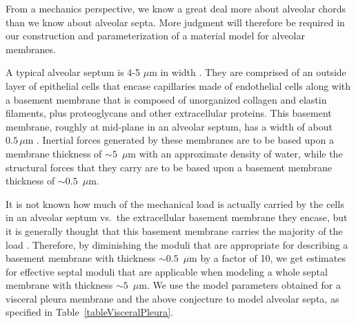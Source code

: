 From a mechanics perspective, we know a great deal more about alveolar chords than we know about alveolar septa.  More judgment will therefore be required in our construction and parameterization of a material model for alveolar membranes.  

A typical alveolar septum is 4-5 $\mu$m in width \cite{Sukietal11}.  They are comprised of an outside layer of epithelial cells that encase capillaries made of endothelial cells along with a basement membrane that is composed of unorganized collagen and elastin filaments, plus proteoglycans and other extracellular proteins.  This basement membrane, roughly at mid-plane in an alveolar septum, has a width of about $0.5 \, \mu$m \cite{RoanWaters11}.  Inertial forces generated by these membranes are to be based upon a membrane thickness of $\sim\!\!5$~$\mu$m with an approximate density of water, while the structural forces that they carry are to be based upon a basement membrane thickness of $\sim\!\! 0.5$~$\mu$m.  

It is not known how much of the mechanical load is actually carried by the cells in an alveolar septum vs.\ the extracellular basement membrane they encase, but it is generally thought that this basement membrane carries the majority of the load \cite{Sukietal11}.  Therefore, by diminishing the moduli that are appropriate for describing a basement membrane with thickness $\sim\!\! 0.5$~$\mu$m by a factor of 10, we get estimates for effective septal moduli that are applicable when modeling a whole septal membrane with thickness $\sim\!\! 5$~$\mu$m.  We use the model parameters obtained for a visceral pleura membrane \cite{Freedetal17} and the above conjecture to model alveolar septa, as specified in Table~\ref{tableVisceralPleura}.

